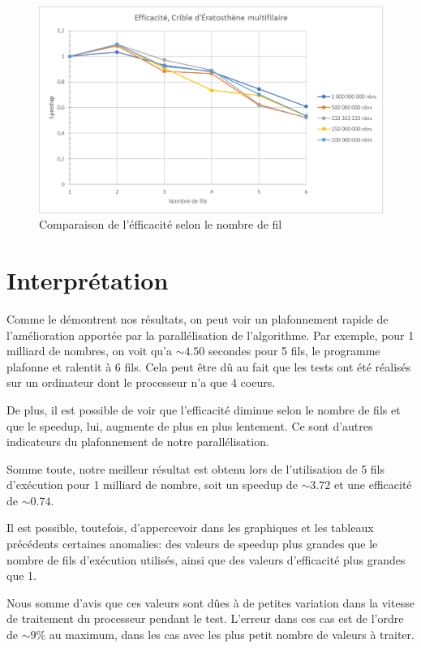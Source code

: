\documentclass{report}
\begin{document}
\begin{center}
	\begin{figure}[H]
		\includegraphics[scale=0.7]{Images/Graph_eff.png}
		\caption{Comparaison de l'éfficacité selon le nombre de fil}
	\end{figure}
\end{center}
\section{Interprétation}
	Comme le démontrent nos résultats, on peut voir un plafonnement rapide
	de l'amélioration apportée par la parallélisation de l'algorithme. Par
	exemple, pour 1 milliard de nombres, on voit qu'a $\sim 4.50$ secondes
	pour 5 fils, le programme plafonne et ralentit à 6 fils. Cela peut être
	dû au fait que les tests ont été réalisés sur un ordinateur dont le
	processeur n'a que 4 coeurs.

	\smallskip
	De plus, il est possible de voir que l'efficacité diminue selon le
	nombre de fils et que le speedup, lui, augmente de plus en plus lentement.
	Ce sont d'autres indicateurs du plafonnement de notre parallélisation.

	\bigskip
	Somme toute, notre meilleur résultat est obtenu lors de l'utilisation de 
	5 fils d'exécution pour 1 milliard de nombre, soit un speedup de $\sim 3.72$
	et une efficacité de $\sim 0.74$.

	\bigskip
	Il est possible, toutefois, d'appercevoir dans les graphiques et les tableaux
	précédents certaines anomalies: des valeurs de speedup plus grandes que le
	nombre de fils d'exécution utilisés, ainsi que des valeurs d'efficacité plus
	grandes que 1.

	\smallskip
	Nous somme d'avis que ces valeurs sont dûes à de petites variation dans la
	vitesse de traitement du processeur	pendant le test. L'erreur dans ces cas
	est de l'ordre de $\sim 9\%$ au maximum, dans les cas avec les plus petit
	nombre de valeurs à traiter.
\end{document}
